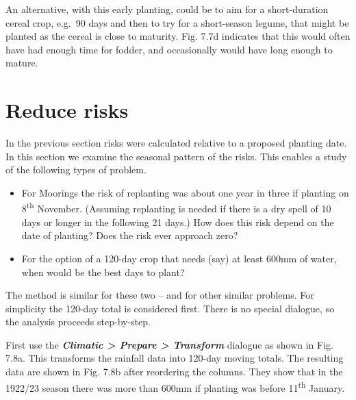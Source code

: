 \documentclass[
  letterpaper,
  DIV=11,
  numbers=noendperiod]{scrreprt}
\begin{document}
An alternative, with this early planting, could be to aim for a
short-duration cereal crop, e.g.~90 days and then to try for a
short-season legume, that might be planted as the cereal is close to
maturity. Fig. 7.7d indicates that this would often have had enough time
for fodder, and occasionally would have long enough to mature.

\section{Reduce risks}\label{reduce-risks}

In the previous section risks were calculated relative to a proposed
planting date. In this section we examine the seasonal pattern of the
risks. This enables a study of the following types of problem.

\begin{itemize}
\item
  For Moorings the risk of replanting was about one year in three if
  planting on 8\textsuperscript{th} November. (Assuming replanting is
  needed if there is a dry spell of 10 days or longer in the following
  21 days.) How does this risk depend on the date of planting? Does the
  risk ever approach zero?
\item
  For the option of a 120-day crop that needs (say) at least 600mm of
  water, when would be the best days to plant?
\end{itemize}

The method is similar for these two -- and for other similar problems.
For simplicity the 120-day total is considered first. There is no
special dialogue, so the analysis proceeds step-by-step.

First use the \textbf{\emph{Climatic \textgreater{} Prepare
\textgreater{} Transform}} dialogue as shown in Fig. 7.8a. This
transforms the rainfall data into 120-day moving totals. The resulting
data are shown in Fig. 7.8b after reordering the columns. They show that
in the 1922/23 season there was more than 600mm if planting was before
11\textsuperscript{th} January.
\end{document}
